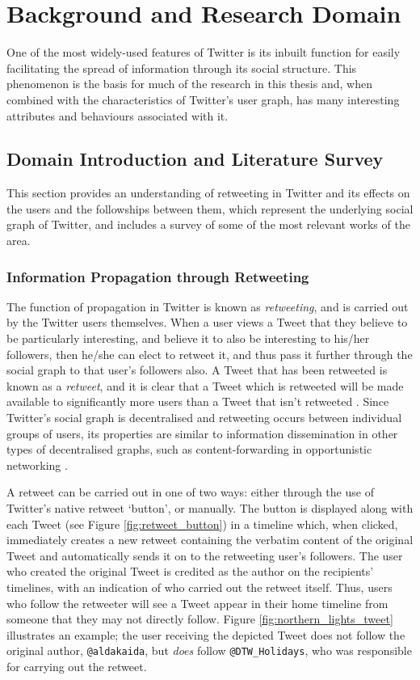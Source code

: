 \chapter{Background and Research Domain}


One of the most widely-used features of Twitter is its inbuilt function for easily facilitating the spread of information through its social structure. This phenomenon is the basis for much of the research in this thesis and, when combined with the characteristics of Twitter's user graph, has many interesting attributes and behaviours associated with it.


\section{Domain Introduction and Literature Survey}
This section provides an understanding of retweeting in Twitter and its effects on the users and the followships between them, which represent the underlying social graph of Twitter, and includes a survey of some of the most relevant works of the area.

\subsection{Information Propagation through Retweeting}
The function of propagation in Twitter is known as \textit{retweeting}, and is carried out by the Twitter users themselves. When a user views a Tweet that they believe to be particularly interesting, and believe it to also be interesting to his/her followers, then he/she can elect to retweet it, and thus pass it further through the social graph to that user's followers also. A Tweet that has been retweeted is known as a \textit{retweet}, and it is clear that a Tweet which is retweeted will be made available to significantly more users than a Tweet that isn't retweeted \cite{webberley11} \cite{kwak10}. Since Twitter's social graph is decentralised and retweeting occurs between individual groups of users, its properties are similar to information dissemination in other types of decentralised graphs, such as content-forwarding in opportunistic networking \cite{allen10}.

A retweet can be carried out in one of two ways: either through the use of Twitter's native retweet `button', or manually. The button is displayed along with each Tweet (see Figure \ref{fig:retweet_button}) in a timeline which, when clicked, immediately creates a new retweet containing the verbatim content of the original Tweet and automatically sends it on to the retweeting user's followers. The user who created the original Tweet is credited as the author on the recipients' timelines, with an indication of who carried out the retweet itself. Thus, users who follow the retweeter will see a Tweet appear in their home timeline from someone that they may not directly follow. Figure \ref{fig:northern_lights_tweet} illustrates an example; the user receiving the depicted Tweet does not follow the original author, \texttt{@aldakaida}, but \textit{does} follow \texttt{@DTW\_Holidays}, who was responsible for carrying out the retweet. 

